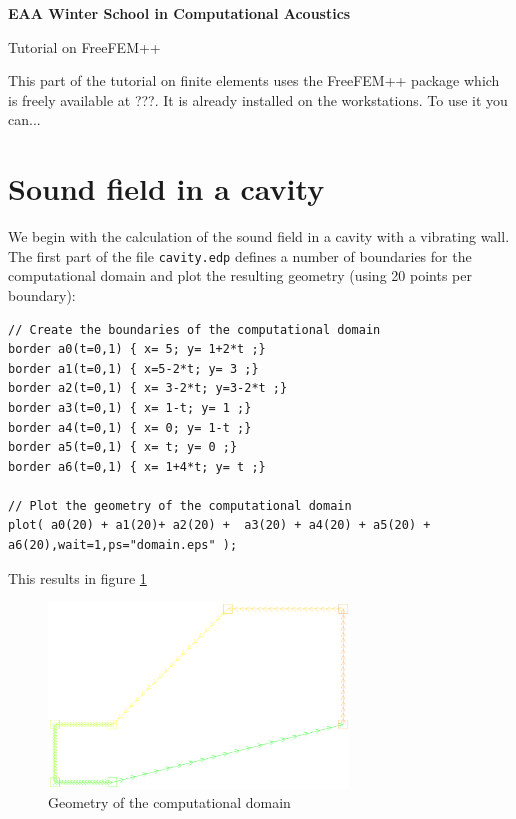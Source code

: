\documentclass[english,3p]{elsarticle}
\newcommand{\code}[1]{\texttt{#1}}
\begin{document}
\begin{center}
\textbf{EAA Winter School in Computational Acoustics}

Tutorial on FreeFEM++
\end{center}

\vspace{10mm}

This part of the tutorial on finite elements uses the FreeFEM++ package which is freely available at ???.
It is already installed on the workstations.
To use it you can...

\section{Sound field in a cavity}

We begin with the calculation of the sound field in a cavity with a vibrating wall.
The first part of the file \code{cavity.edp} defines a number of boundaries for the computational domain and plot the resulting geometry (using 20 points per boundary):
\begin{lstlisting}
// Create the boundaries of the computational domain
border a0(t=0,1) { x= 5; y= 1+2*t ;}
border a1(t=0,1) { x=5-2*t; y= 3 ;} 
border a2(t=0,1) { x= 3-2*t; y=3-2*t ;}
border a3(t=0,1) { x= 1-t; y= 1 ;} 
border a4(t=0,1) { x= 0; y= 1-t ;} 
border a5(t=0,1) { x= t; y= 0 ;} 
border a6(t=0,1) { x= 1+4*t; y= t ;}

// Plot the geometry of the computational domain
plot( a0(20) + a1(20)+ a2(20) +  a3(20) + a4(20) + a5(20) + a6(20),wait=1,ps="domain.eps" );
\end{lstlisting}
This results in figure \ref{fig:geometry}
\begin{figure}[h]
\centering
\includegraphics[width=80mm]{domain.eps}
\caption{Geometry of the computational domain}
\label{fig:geometry}
\end{figure}
\end{document}
